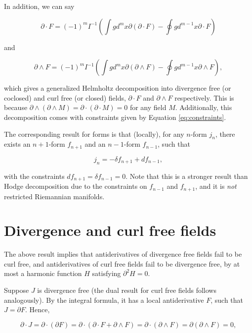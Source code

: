 \documentclass[twocolumn]{article}
\begin{document}
In addition, we can say

\begin{equation}
  \partial \cdot F = (-1)^m I^{-1} \left(\int g d^{m}x \partial (\partial \cdot F) - \oint g d^{m-1}x \partial \cdot F\right)
\end{equation}

and

\begin{equation}
  \partial \wedge F = (-1)^m I^{-1} \left(\int g d^{m}x \partial (\partial \wedge F) - \oint g d^{m-1}x \partial \wedge F\right),
\end{equation}

which gives a generalized Helmholtz decomposition into divergence free (or coclosed) and curl free (or closed) fields, $\partial \cdot F$ and $\partial \wedge F$ respectively. This is because $\partial \wedge (\partial \wedge M) = \partial \cdot (\partial \cdot M) = 0$ for any field $M$. Additionally, this decomposition comes with constraints given by Equation \ref{eq:constraints}.

The corresponding result for forms is that (locally), for any $n$-form $j_n$, there exists an $n+1$-form $f_{n+1}$ and an $n-1$-form $f_{n-1}$, such that

\begin{equation}
  j_n = -\delta f_{n+1} + d f_{n-1},
\end{equation}

with the constraints $df_{n+1}=\delta f_{n-1} = 0$. Note that this is a stronger result than Hodge decomposition due to the constraints on $f_{n-1}$ and $f_{n+1}$, and it is \emph{not} restricted Riemannian manifolds.

\section{Divergence and curl free fields}

The above result implies that antiderivatives of divergence free fields fail to be curl free, and antiderivatives of curl free fields fail to be divergence free, by at most a harmonic function $H$ satisfying $\partial^2 H = 0$.

Suppose $J$ is divergence free (the dual result for curl free fields follows analogously). By the integral formula, it has a local antiderivative $F$, such that $J = \partial F$. Hence,

\begin{equation}
  \partial \cdot J = \partial \cdot (\partial F) = \partial \cdot (\partial \cdot F + \partial \wedge F) = \partial \cdot (\partial \wedge F) = \partial (\partial \wedge F) = 0,
\end{equation}
\end{document}
